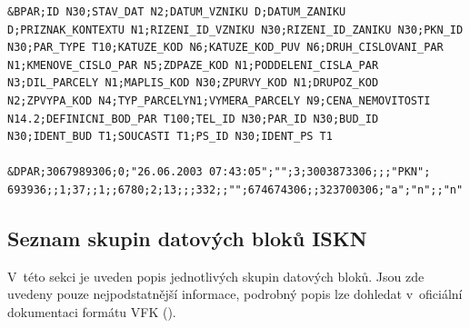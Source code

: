 \documentclass[a4paper,12pt,oneside]{book}
\begin{document}
\begin{lstlisting}
&BPAR;ID N30;STAV_DAT N2;DATUM_VZNIKU D;DATUM_ZANIKU D;PRIZNAK_KONTEXTU N1;RIZENI_ID_VZNIKU N30;RIZENI_ID_ZANIKU N30;PKN_ID N30;PAR_TYPE T10;KATUZE_KOD N6;KATUZE_KOD_PUV N6;DRUH_CISLOVANI_PAR N1;KMENOVE_CISLO_PAR N5;ZDPAZE_KOD N1;PODDELENI_CISLA_PAR N3;DIL_PARCELY N1;MAPLIS_KOD N30;ZPURVY_KOD N1;DRUPOZ_KOD N2;ZPVYPA_KOD N4;TYP_PARCELYN1;VYMERA_PARCELY N9;CENA_NEMOVITOSTI N14.2;DEFINICNI_BOD_PAR T100;TEL_ID N30;PAR_ID N30;BUD_ID N30;IDENT_BUD T1;SOUCASTI T1;PS_ID N30;IDENT_PS T1

&DPAR;3067989306;0;"26.06.2003 07:43:05";"";3;3003873306;;;"PKN"; 693936;;1;37;;1;;6780;2;13;;;332;;"";674674306;;323700306;"a";"n";;"n"
\end{lstlisting}

\subsection*{Seznam skupin datových bloků ISKN}

V~této sekci je uveden popis jednotlivých skupin datových bloků. Jsou zde uvedeny pouze nejpodstatnější informace, podrobný popis lze dohledat v~oficiální dokumentaci formátu VFK (\cite{vfk_struktura}).
\end{document}
